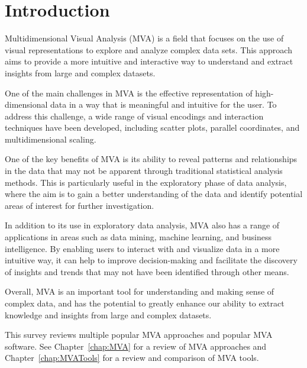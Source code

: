 %
%
% 
% 
% 


\chapter{Introduction}

\label{chap:Intro}



Multidimensional Visual Analysis (MVA) is a field that focuses on the
use of visual representations to explore and analyze complex data
sets. This approach aims to provide a more intuitive and interactive
way to understand and extract insights from large and complex
datasets.

One of the main challenges in MVA is the effective representation of
high-dimensional data in a way that is meaningful and intuitive for
the user. To address this challenge, a wide range of visual encodings
and interaction techniques have been developed, including scatter
plots, parallel coordinates, and multidimensional scaling.

One of the key benefits of MVA is its ability to reveal patterns and
relationships in the data that may not be apparent through traditional
statistical analysis methods. This is particularly useful in the
exploratory phase of data analysis, where the aim is to gain a better
understanding of the data and identify potential areas of interest for
further investigation.

In addition to its use in exploratory data analysis, MVA also has a
range of applications in areas such as data mining, machine learning,
and business intelligence. By enabling users to interact with and
visualize data in a more intuitive way, it can help to improve
decision-making and facilitate the discovery of insights and trends
that may not have been identified through other means.

Overall, MVA is an important tool for understanding and making sense
of complex data, and has the potential to greatly enhance our ability
to extract knowledge and insights from large and complex datasets.

This survey reviews multiple popular MVA approaches and popular MVA
software. See Chapter~\ref{chap:MVA} for a review of MVA approaches and
Chapter~\ref{chap:MVATools} for a review and comparison of MVA tools.

